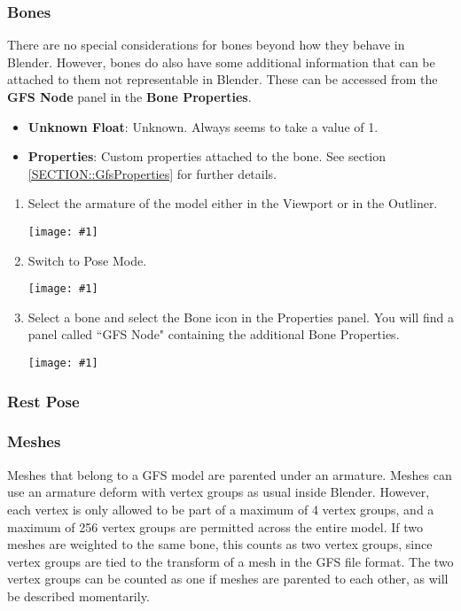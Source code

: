 \documentclass{article}
\newenvironment{guide}[1]
{
	\begin{center}
		\begin{tcolorbox}[%
			colback=black!20, 
			boxrule=0pt, 
			title=Step-by-step: #1,
			enhanced,
			breakable,
			overlay unbroken={%
                \draw[line width=1pt, black, rounded corners]
        	    (frame.north west) rectangle (frame.south east);
			},
    		overlay first={%
        		 \draw[line width=1pt, black, rounded corners]
        	    (frame.south west) -- (frame.north west) -- (frame.north east) -- (frame.south east);
                \draw[line width=1pt, black]
                (frame.south west) -- (frame.south east);
            },
    		overlay middle={%
                \draw[line width=1pt, black]
        	    (frame.north west) rectangle (frame.south east);
        	},
    		overlay last={%
                \draw[line width=1pt, black, rounded corners]
        	    (frame.north west) -- (frame.south west) -- (frame.south east) -- (frame.north east);
                \draw[line width=1pt, black]
                (frame.north west) -- (frame.north east);
           	}
        ]{}
    	\begin{enumerate}
}
{
    		\end{enumerate}
    	\end{tcolorbox}
	\end{center}  	 
}
\newcommand{\guideimage}[1]
{
	\begin{center}
		\texttt{[image: \#1]}
	\end{center}
}
\begin{document}
\subsubsection{Bones}
\label{SECTION::EditingBones} 
There are no special considerations for bones beyond how they behave in Blender. However, bones do also have some additional information that can be attached to them not representable in Blender. These can be accessed from the \textbf{GFS Node} panel in the \textbf{Bone Properties}.

\begin{itemize}
\item \textbf{Unknown Float}: Unknown. Always seems to take a value of 1.
\item \textbf{Properties}: Custom properties attached to the bone. See section \ref{SECTION::GfsProperties} for further details.
\end{itemize}

\begin{guide}{Accessing Extra Bone Properties}
\item Select the armature of the model either in the Viewport or in the Outliner.
\guideimage{images/editing_models/edits_select_armature.png}
\item Switch to Pose Mode.
\guideimage{images/editing_models/edits_to_pose_mode.png}
\item Select a bone and select the Bone icon in the Properties panel. You will find a panel called ``GFS Node" containing the additional Bone Properties.
\guideimage{images/editing_models/edits_bone_properties.png}
\end{guide}
\clearpage

\subsubsection{Rest Pose}

\subsubsection{Meshes}
Meshes that belong to a GFS model are parented under an armature. Meshes can use an armature deform with vertex groups as usual inside Blender. However, each vertex is only allowed to be part of a maximum of 4 vertex groups, and a maximum of 256 vertex groups are permitted across the entire model. If two meshes are weighted to the same bone, this counts as two vertex groups, since vertex groups are tied to the transform of a mesh in the GFS file format. The two vertex groups can be counted as one if meshes are parented to each other, as will be described momentarily.
\end{document}
